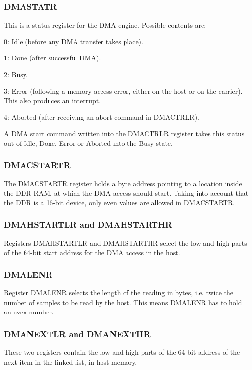\documentclass[10pt,a4paper]{cerndoc}
\begin{document}
\subsubsection{DMASTATR}
This is a status register for the DMA engine. Possible contents are:
\begin{packed_item}
\item 0: Idle (before any DMA transfer takes place).
\item 1: Done (after successful DMA).
\item 2: Busy.
\item 3: Error (following a memory access error, either on the host or on the carrier). This also produces an interrupt.
\item 4: Aborted (after receiving an abort command in DMACTRLR).
\end{packed_item}
A DMA start command written into the DMACTRLR register takes this status out of Idle, Done, Error or Aborted into the Busy state.

\subsubsection{DMACSTARTR}
The DMACSTARTR register holds a byte address pointing to a location inside the DDR RAM, at which the DMA access should start. Taking into account that the DDR is a 16-bit device, only even values are allowed in DMACSTARTR.

\subsubsection{DMAHSTARTLR and DMAHSTARTHR}
Registers DMAHSTARTLR and DMAHSTARTHR select the low and high parts of the 64-bit start address for the DMA access in the host. 

\subsubsection{DMALENR}
Register DMALENR selects the length of the reading in bytes, i.e. twice the number of samples to be read by the host. This means DMALENR has to hold an even number.

\subsubsection{DMANEXTLR and DMANEXTHR}
These two registers contain the low and high parts of the 64-bit address of the next item in the linked list, in host memory.
\end{document}
